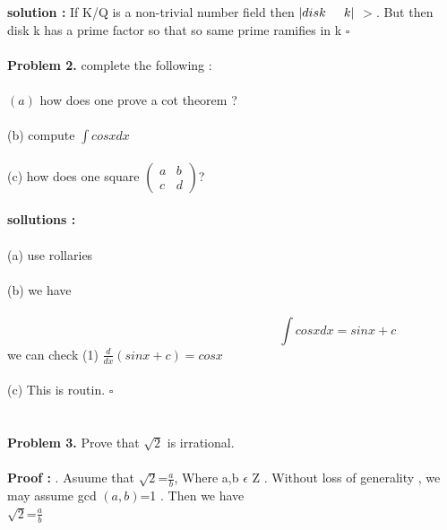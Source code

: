 \documentclass{exam}
\begin{document}
 \textbf{solution : }
     If K/Q is a non-trivial number field then $|disk \hspace{0.5cm} k|$ $>$. But then disk k has a prime factor so that so same prime ramifies in \huge k 
   \hspace{10.5cm}$\square$
     \\ \\
     \textbf{Problem 2.}  complete the following :\\ \\
     $(a)$ \hspace{1cm} how does one prove a cot theorem ?\\ \\
     (b) \hspace{1cm} compute $\int cosx dx$\\ \\ 
     (c) \hspace{1cm} how does one square 
     $
\begin{pmatrix}
      a & b \\
      c & d 
\end{pmatrix} $? \\ \\
 \newpage \textbf{sollutions : }\\ \\
  (a) use rollaries\\ \\
  (b) we have \\ \\
  \begin{equation}
   \hspace{7cm}
   \int cosx dx =sinx +c  
 \end{equation}
\hspace{1cm} we can check (1) 
  \hspace{2cm} $\frac{d}{dx} (sinx + c) = cosx$ \\ \\
 (c) This is routin. \hspace{12.5cm}$\square $ \\ \\ \\
\textbf{Problem 3.} Prove that $ \sqrt{2}$ is irrational. \\ \\
 \textbf{Proof :} . Asuume that $\sqrt{2}$=$\frac{a}{b}$, Where a,b  $\epsilon $  Z . Without loss of generality , we may assume gcd $(a,b)$=1 . Then we have \\
 
  \hspace{6cm}  $\sqrt{2}$=$\frac{a}{b}$ 
  
\end{document}
